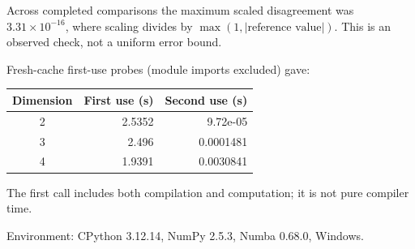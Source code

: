 Across completed comparisons the maximum scaled disagreement was $3.31\times10^{-16}$, where scaling divides by $\max(1,|\text{reference value}|)$. This is an observed check, not a uniform error bound.

Fresh-cache first-use probes (module imports excluded) gave:
\begin{center}\small
\begin{tabular}{@{}crr@{}}\toprule
Dimension&First use (s)&Second use (s)\\\midrule
2&2.5352&9.72e-05\\
3&2.496&0.0001481\\
4&1.9391&0.0030841\\
\bottomrule
\end{tabular}
\end{center}
The first call includes both compilation and computation; it is not pure compiler time.

Environment: CPython 3.12.14, NumPy 2.5.3, Numba 0.68.0, Windows.
